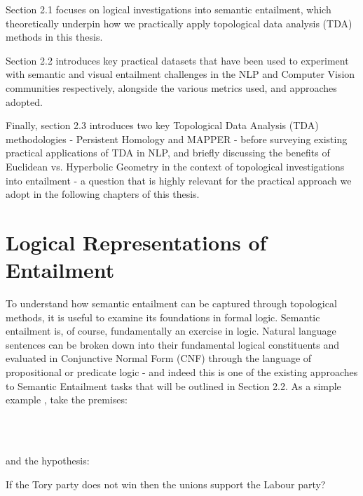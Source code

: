 \documentclass[12pt,twoside]{report}
\begin{document}
Section 2.1 focuses on logical investigations into semantic entailment, which theoretically underpin how we practically apply topological data analysis (TDA) methods in this thesis. \par \quad Section 2.2 introduces key practical datasets that have been used to experiment with semantic and visual entailment challenges in the NLP and Computer Vision communities respectively, alongside the various metrics used, and approaches adopted.  \par \quad Finally, section 2.3 introduces two key Topological Data Analysis (TDA) methodologies - Persistent Homology and MAPPER - before surveying existing practical applications of TDA in NLP, and briefly discussing the benefits of Euclidean vs. Hyperbolic Geometry in the context of topological investigations into entailment - a question that is highly relevant for the practical approach we adopt in the following chapters of this thesis. 

\section{Logical Representations of Entailment}

To understand how semantic entailment can be captured through topological methods, it is useful to examine its foundations in formal logic. Semantic entailment is, of course, fundamentally an exercise in logic. Natural language sentences can be broken down into their fundamental logical constituents and evaluated in Conjunctive Normal Form (CNF) through the language of propositional or predicate logic - and indeed this is one of the existing approaches to Semantic Entailment tasks that will be outlined in Section 2.2. As a simple example \cite{fSadri}, take the premises: 
\begin{flushleft}
 \\
 \\

\end{flushleft}

\par and the hypothesis:
\begin{flushleft}
If the Tory party does not win then the unions
support the Labour party?    
\end{flushleft}
\end{document}
